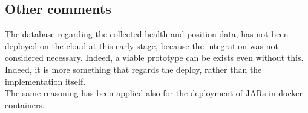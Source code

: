 \subsection{Other comments}
The database regarding the collected health and position data, has not been deployed on the cloud at this
early stage, because the integration was not considered necessary. Indeed, a viable prototype can be 
exists even without this. Indeed, it is more something that regards the deploy, rather than the 
implementation itself. \\
The same reasoning has been applied also for the deployment of JARs in docker containers.